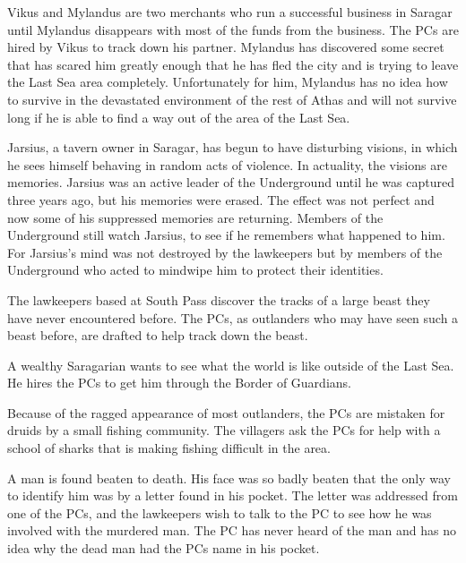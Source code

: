 {
	\item Vikus and Mylandus are two merchants who run a successful business in Saragar until Mylandus disappears with most of the funds from the business. The PCs are hired by Vikus to track down his partner. Mylandus has discovered some secret that has scared him greatly enough that he has fled the city and is trying to leave the Last Sea area completely. Unfortunately for him, Mylandus has no idea how to survive in the devastated environment of the rest of Athas and will not survive long if he is able to find a way out of the area of the Last Sea.
	\item Jarsius, a tavern owner in Saragar, has begun to have disturbing visions, in which he sees himself behaving in random acts of violence. In actuality, the visions are memories. Jarsius was an active leader of the Underground until he was captured three years ago, but his memories were erased. The effect was not perfect and now some of his suppressed memories are returning. Members of the Underground still watch Jarsius, to see if he remembers what happened to him. For Jarsius's mind was not destroyed by the lawkeepers but by members of the Underground who acted to mindwipe him to protect their identities.
	\item The lawkeepers based at South Pass discover the tracks of a large beast they have never encountered before. The PCs, as outlanders who may have seen such a beast before, are drafted to help track down the beast.
	\item A wealthy Saragarian wants to see what the world is like outside of the Last Sea. He hires the PCs to get him through the Border of Guardians.
	\item Because of the ragged appearance of most outlanders, the PCs are mistaken for druids by a small fishing community. The villagers ask the PCs for help with a school of sharks that is making fishing difficult in the area.
	\item A man is found beaten to death. His face was so badly beaten that the only way to identify him was by a letter found in his pocket. The letter was addressed from one of the PCs, and the lawkeepers wish to talk to the PC to see how he was involved with the murdered man. The PC has never heard of the man and has no idea why the dead man had the PCs name in his pocket.
}
